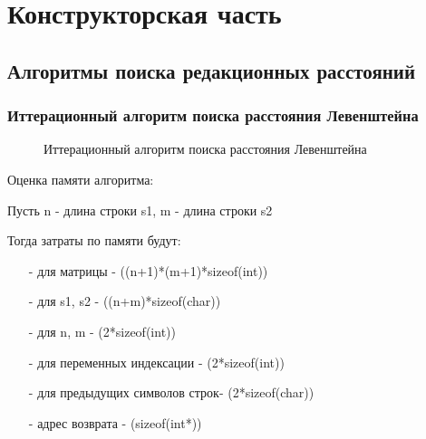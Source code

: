 \section{Конструкторская часть}
\subsection{Алгоритмы поиска редакционных расстояний}
\subsubsection{Иттерационный алгоритм поиска расстояния Левенштейна}
\begin{figure}[h]
	\centering
    \def\svgscale{0.75}
	
	\label{fig:d11}
\end{figure}
\begin{figure}[!h]
	\centering
    \def\svgscale{0.5}
	
	\caption{Иттерационный алгоритм поиска расстояния Левенштейна}
	\label{fig:d12}
\end{figure}
\pagebreak

Оценка памяти алгоритма:\par
Пусть n - длина строки s1, m - длина строки s2\par
Тогда затраты по памяти будут:\par
\begin{itemize}
	\item[-] для матрицы - ((n+1)*(m+1)*sizeof(int))
	\item[-] для s1, s2 - ((n+m)*sizeof(char))
	\item[-] для n, m - (2*sizeof(int))
	\item[-] для переменных индексации - (2*sizeof(int))
	\item[-] для предыдущих символов строк- (2*sizeof(char))
	\item[-] адрес возврата - (sizeof(int*))
\end{itemize}
\pagebreak

